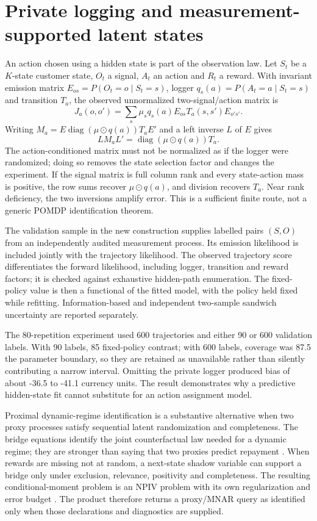 \section{Private logging and measurement-supported latent states}
\label{s5:private-logger}

An action chosen using a hidden state is part of the observation law. Let
$S_t$ be a $K$-state customer state, $O_t$ a signal, $A_t$ an action and
$R_t$ a reward. With invariant emission matrix $E_{os}=P(O_t=o\mid S_t=s)$,
logger $q_s(a)=P(A_t=a\mid S_t=s)$ and transition $T_a$, the observed
unnormalized two-signal/action matrix is
\[
 J_a(o,o')=\sum_s\mu_s q_s(a)E_{os}T_a(s,s')E_{o's'}.
\]
Writing $M_a=E\operatorname{diag}(\mu\odot q(a))T_aE'$ and a left inverse
$L$ of $E$ gives
\[
 L M_a L'=\operatorname{diag}(\mu\odot q(a))T_a.
\]
The action-conditioned matrix must not be normalized as if the logger were
randomized; doing so removes the state selection factor and changes the
experiment. If the signal matrix is full column rank and every state-action
mass is positive, the row sums recover $\mu\odot q(a)$, and division recovers
$T_a$. Near rank deficiency, the two inversions amplify error. This is a
sufficient finite route, not a generic POMDP identification theorem.

The validation sample in the new construction supplies labelled pairs
$(S,O)$ from an independently audited measurement process. Its emission
likelihood is included jointly with the trajectory likelihood. The observed
trajectory score differentiates the forward likelihood, including logger,
transition and reward factors; it is checked against exhaustive hidden-path
enumeration. The fixed-policy value is then a functional of the fitted model,
with the policy held fixed while refitting. Information-based and independent
two-sample sandwich uncertainty are reported separately.

The 80-repetition experiment used 600 trajectories and either 90 or 600
validation labels. With 90 labels, 85%
fixed-policy contrast; with 600 labels, coverage was 87.5%
the parameter boundary, so they are retained as unavailable rather than
silently contributing a narrow interval. Omitting the private logger produced
bias of about -36.5 to -41.1 currency units. The result demonstrates why a
predictive hidden-state fit cannot substitute for an action assignment model.

Proximal dynamic-regime identification is a substantive alternative when
two proxy processes satisfy sequential latent randomization and completeness.
The bridge equations identify the joint counterfactual law needed for a
dynamic regime; they are stronger than saying that two proxies predict
repayment \citep{zhangprox2024}. When rewards are missing not at random, a
next-state shadow variable can support a bridge only under exclusion,
relevance, positivity and completeness. The resulting conditional-moment
problem is an NPIV problem with its own regularization and error budget
\citep{wei2026}. The product therefore returns a proxy/MNAR query as
identified only when those declarations and diagnostics are supplied.

